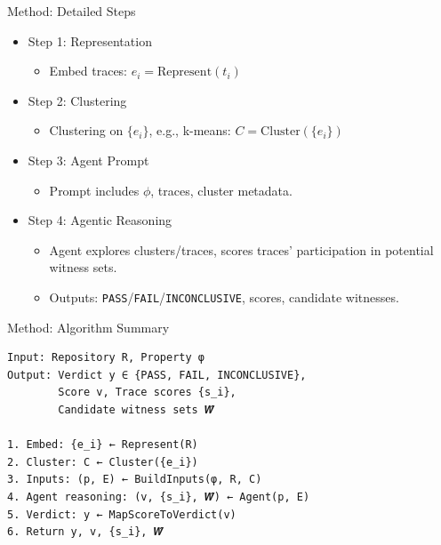 \documentclass{beamer}
\newcommand{\alertterm}[1]{\alert{#1}}
\begin{document}
\begin{frame}{Method: Detailed Steps}
\begin{itemize}
    \item \alertterm{Step 1: Representation}
    \begin{itemize}
        \item Embed traces: $e_i = \mathrm{Represent}(t_i)$
    \end{itemize}
    \item \alertterm{Step 2: Clustering}
    \begin{itemize}
        \item Clustering on $\{e_i\}$, e.g., k-means: $C = \mathrm{Cluster}(\{e_i\})$
    \end{itemize}
    \item \alertterm{Step 3: Agent Prompt}
    \begin{itemize}
        \item Prompt includes $\phi$, traces, cluster metadata.
    \end{itemize}
    \item \alertterm{Step 4: Agentic Reasoning}
    \begin{itemize}
        \item Agent explores clusters/traces, scores traces' participation in potential witness sets.
        \item Outputs: \texttt{PASS}/\texttt{FAIL}/\texttt{INCONCLUSIVE}, scores, candidate witnesses.
    \end{itemize}
\end{itemize}
\end{frame}
\begin{frame}[fragile]{Method: Algorithm Summary}
\begin{verbatim}
Input: Repository R, Property φ
Output: Verdict y ∈ {PASS, FAIL, INCONCLUSIVE},
        Score v, Trace scores {s_i},
        Candidate witness sets 𝑾̂

1. Embed: {e_i} ← Represent(R)
2. Cluster: C ← Cluster({e_i})
3. Inputs: (p, E) ← BuildInputs(φ, R, C)
4. Agent reasoning: (v, {s_i}, 𝑾̂) ← Agent(p, E)
5. Verdict: y ← MapScoreToVerdict(v)
6. Return y, v, {s_i}, 𝑾̂
\end{verbatim}
\label{alg:meerkat}
\end{frame}
\end{document}
